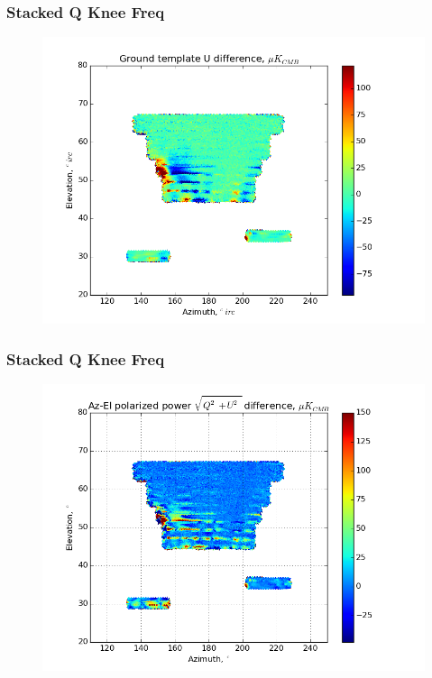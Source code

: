 \documentclass{beamer}
\begin{document}
\begin{frame}
\frametitle{Stacked Q Knee Freq}
\begin{figure}
\includegraphics[width=0.9\linewidth]{dU_gt_STACK_Q_FKNEE.png}
\end{figure}
\end{frame}

\begin{frame}
\frametitle{Stacked Q Knee Freq}
\begin{figure}
\includegraphics[width=0.9\linewidth]{dMag_gt_STACK_Q_FKNEE.png}
\end{figure}
\end{frame}
\end{document}

